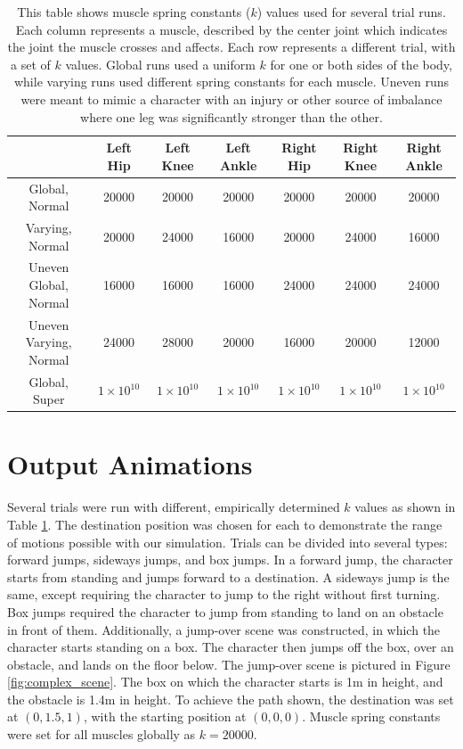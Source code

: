 \begin{table}[ht]
	\centering
	\scriptsize
	\begin{tabular}{| c | c | c | c | c | c | c |}
		\hline
		& Left Hip & Left Knee & Left Ankle & Right Hip & Right Knee & Right Ankle \\ \hline
		Global, Normal & 20000 & 20000 & 20000 & 20000 & 20000 & 20000 \\ \hline
		Varying, Normal & 20000 & 24000 & 16000 & 20000 & 24000 & 16000 \\ \hline
		Uneven Global, Normal & 16000 & 16000 & 16000 & 24000 & 24000 & 24000 \\ \hline
		Uneven Varying, Normal & 24000 & 28000 & 20000 & 16000 & 20000 & 12000 \\ \hline
		Global, Super & $1 \times 10^{10}$ & $1 \times 10^{10}$ & $1 \times 10^{10}$ & $1 \times 10^{10}$ & $1 \times 10^{10}$ & $1 \times 10^{10}$ \\ \hline
	\end{tabular}
	\caption[Table of spring constants for each trial]{This table shows muscle spring constants ($k$) values used for several trial runs.  Each column represents a muscle, described by the center joint which indicates the joint the muscle crosses and affects.  Each row represents a different trial, with a set of $k$ values.  Global runs used a uniform $k$ for one or both sides of the body, while varying runs used different spring constants for each muscle.  Uneven runs were meant to mimic a character with an injury or other source of imbalance where one leg was significantly stronger than the other.}
	\label{tab:run_k_vals}
\end{table}


\section{Output Animations}
\label{section:image_results}

Several trials were run with different, empirically determined $k$ values as shown in Table \ref{tab:run_k_vals}.  The destination position was chosen for each to demonstrate the range of motions possible with our simulation.  Trials can be divided into several types: forward jumps, sideways jumps, and box jumps.  In a forward jump, the character starts from standing and jumps forward to a destination.  A sideways jump is the same, except requiring the character to jump to the right without first turning.  Box jumps required the character to jump from standing to land on an obstacle in front of them.  Additionally, a jump-over scene was constructed, in which the character starts standing on a box.  The character then jumps off the box, over an obstacle, and lands on the floor below.  The jump-over scene is pictured in Figure \ref{fig:complex_scene}.  The box on which the character starts is 1m in height, and the obstacle is 1.4m in height.  To achieve the path shown, the destination was set at $(0, 1.5, 1)$, with the starting position at $(0, 0, 0)$.  Muscle spring constants were set for all muscles globally as $k=20000$.

